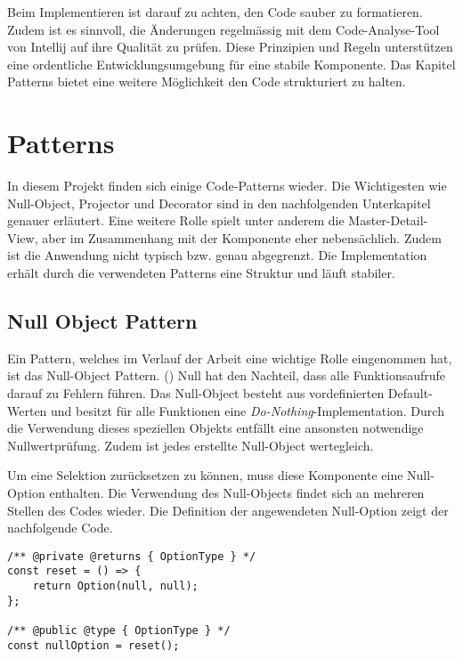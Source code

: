 Beim Implementieren ist darauf zu achten, den Code sauber zu formatieren.
Zudem ist es sinnvoll, die Änderungen regelmässig mit dem Code-Analyse-Tool von Intellij auf ihre Qualität zu prüfen. 
Diese Prinzipien und Regeln unterstützen eine ordentliche Entwicklungsumgebung für eine stabile Komponente.
Das Kapitel Patterns bietet eine weitere Möglichkeit den Code strukturiert zu halten.


\section{Patterns}
\label{sec:patterns}

In diesem Projekt finden sich einige Code-Patterns wieder.
Die Wichtigesten wie Null-Object, Projector und Decorator sind in den nachfolgenden Unterkapitel genauer erläutert.
Eine weitere Rolle spielt unter anderem die Master-Detail-View, aber im Zusammenhang mit der Komponente eher nebensächlich.
Zudem ist die Anwendung nicht typisch bzw. genau abgegrenzt.
Die Implementation erhält durch die verwendeten Patterns eine Struktur und läuft stabiler.


\subsection{Null Object Pattern}
\label{sec:nullPattern}

Ein Pattern, welches im Verlauf der Arbeit eine wichtige Rolle eingenommen hat, ist das Null-Object Pattern.
(\cite{nullObjectPattern}) Null hat den Nachteil, dass alle Funktionsaufrufe darauf zu Fehlern führen.
Das Null-Object besteht aus vordefinierten Default-Werten und besitzt für alle Funktionen eine \emph{Do-Nothing}-Implementation.
Durch die Verwendung dieses speziellen Objekts entfällt eine ansonsten notwendige Nullwertprüfung.
Zudem ist jedes erstellte Null-Object wertegleich.

Um eine Selektion zurücksetzen zu können, muss diese Komponente eine Null-Option enthalten.
Die Verwendung des Null-Objects findet sich an mehreren Stellen des Codes wieder.
Die Definition der angewendeten Null-Option zeigt der nachfolgende Code.

\begin{lstlisting}[style = htmlcssjs, caption = Null-Option Definition, label = code:nullOption]
/** @private @returns { OptionType } */
const reset = () => {
    return Option(null, null);
};

/** @public @type { OptionType } */
const nullOption = reset();
\end{lstlisting}

